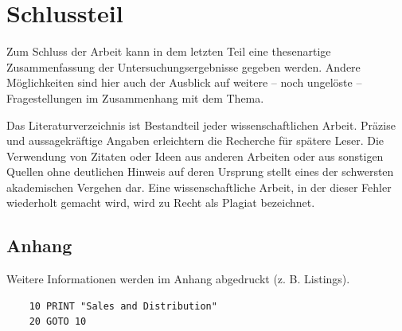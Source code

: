 \documentclass[11pt]{scrartcl}
\begin{document}
\section{Schlussteil}
Zum Schluss der Arbeit kann in dem letzten Teil eine thesenartige Zusammenfassung der Untersuchungsergebnisse gegeben werden. Andere Möglichkeiten sind hier auch der Ausblick auf weitere – noch ungelöste – Fragestellungen im Zusammenhang mit dem Thema.

\newpage


Das Literaturverzeichnis ist Bestandteil jeder wissenschaftlichen Arbeit. Präzise und aussagekräftige Angaben erleichtern die Recherche für spätere Leser. Die Verwendung von Zitaten oder Ideen aus anderen Arbeiten oder aus sonstigen Quellen ohne deutlichen Hinweis auf deren Ursprung stellt eines der schwersten akademischen Vergehen dar. Eine wissenschaftliche Arbeit, in der dieser Fehler wiederholt gemacht wird, wird zu Recht als Plagiat bezeichnet.



\newpage

\begin{appendix}

\section{Anhang}
Weitere Informationen werden im Anhang abgedruckt (z. B. Listings).

	\begin{verbatim}
	10 PRINT "Sales and Distribution"
	20 GOTO 10
	\end{verbatim}
	
\end{appendix}

\clearpage

\end{document}
